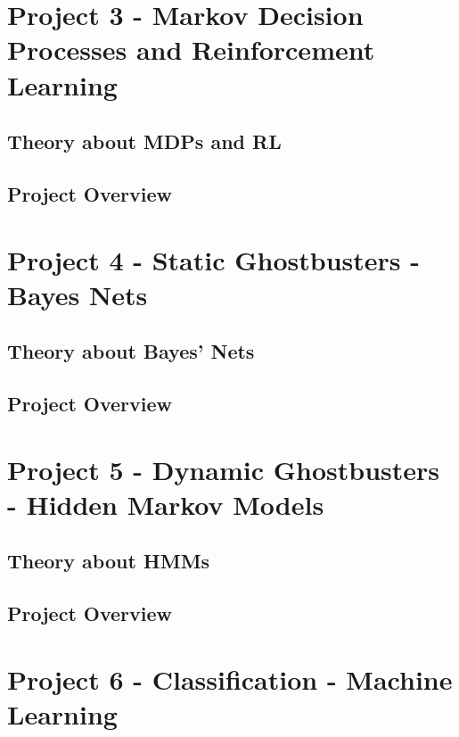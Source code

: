 \documentclass[]{article}
\begin{document}
\section{Project 3 - Markov Decision Processes and Reinforcement Learning}\label{P3}

\subsection{Theory about MDPs and RL}

\subsection{Project Overview}


\pagebreak

\section{Project 4 - Static Ghostbusters - Bayes Nets}\label{P4}

\subsection{Theory about Bayes' Nets}

\subsection{Project Overview}


\pagebreak

\section{Project 5 - Dynamic Ghostbusters - Hidden Markov Models}\label{P5}

\subsection{Theory about HMMs}

\subsection{Project Overview}


\pagebreak

\section{Project 6 - Classification - Machine Learning}\label{P6}
\end{document}
